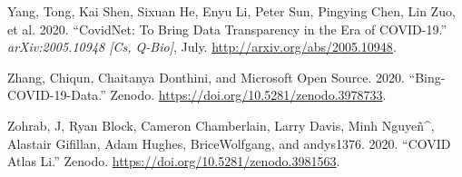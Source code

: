 \documentclass[10pt,letterpaper]{article}
\begin{document}
\leavevmode\hypertarget{ref-yangCovidNetBringData2020}{}%
Yang, Tong, Kai Shen, Sixuan He, Enyu Li, Peter Sun, Pingying Chen, Lin
Zuo, et al. 2020. ``CovidNet: To Bring Data Transparency in the Era of
COVID-19.'' \emph{arXiv:2005.10948 {[}Cs, Q-Bio{]}}, July.
\url{http://arxiv.org/abs/2005.10948}.

\leavevmode\hypertarget{ref-chiqunzhangBingCOVID19Data2020}{}%
Zhang, Chiqun, Chaitanya Donthini, and Microsoft Open Source. 2020.
``Bing-COVID-19-Data.'' Zenodo.
\url{https://doi.org/10.5281/zenodo.3978733}.

\leavevmode\hypertarget{ref-jzohrabCOVIDAtlasLi2020}{}%
Zohrab, J, Ryan Block, Cameron Chamberlain, Larry Davis, Minh
Nguyeñ\^{}, Alastair Gifillan, Adam Hughes, BriceWolfgang, and
andys1376. 2020. ``COVID Atlas Li.'' Zenodo.
\url{https://doi.org/10.5281/zenodo.3981563}.

\nolinenumbers
\end{document}
